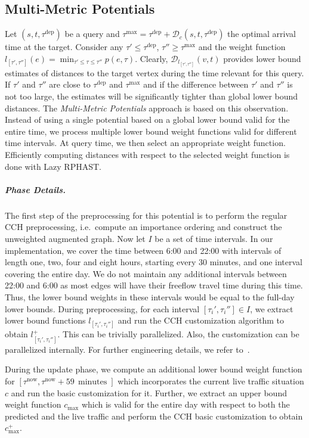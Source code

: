 \documentclass[a4paper,UKenglish,cleveref, autoref, thm-restate,anonymous]{lipics-v2021}
\newcommand*{\pred}{p}
\newcommand*{\comb}{c}
\newcommand*{\dist}{\mathcal{D}}
\newcommand*{\tdep}{\tau^{\operatorname{dep}}}
\newcommand*{\tmax}{\tau^{\max}}
\begin{document}
\subsection{Multi-Metric Potentials}

Let $(s,t,\tdep)$ be a query and $\tmax = \tdep + \dist_c(s,t,\tdep)$ the optimal arrival time at the target.
Consider any $\tau' \leq \tdep$, $\tau'' \geq \tmax$ and the weight function $l_{[\tau', \tau'']}(e) = \min_{\tau' \leq \tau \leq \tau''}\pred(e, \tau)$. %
Clearly, $\dist_{l_{[\tau', \tau'']}}(v,t)$ provides lower bound estimates of distances to the target vertex during the time relevant for this query.
If $\tau'$ and $\tau''$ are close to $\tdep$ and $\tmax$ and if the difference between $\tau'$ and $\tau''$ is not too large, the estimates will be significantly tighter than global lower bound distances.
The \emph{Multi-Metric Potentials} approach is based on this observation.
Instead of using a single potential based on a global lower bound valid for the entire time, we process multiple lower bound weight functions valid for different time intervals.
At query time, we then select an appropriate weight function.
Efficiently computing distances with respect to the selected weight function is done with Lazy RPHAST.

\subparagraph{Phase Details.}
The first step of the preprocessing for this potential is to perform the regular CCH preprocessing, i.e.\ compute an importance ordering and construct the unweighted augmented graph.
Now let $I$ be a set of time intervals.
In our implementation,
we cover the time between 6:00 and 22:00 with intervals of length one, two, four and eight hours, starting every 30 minutes,
and one interval covering the entire day.
We do not maintain any additional intervals between 22:00 and 6:00 as most edges will have their freeflow travel time during this time.
Thus, the lower bound weights in these intervals would be equal to the full-day lower bounds.
During preprocessing, for each interval $[\tau_i', \tau_i''] \in I$, we extract lower bound functions $l_{[\tau_i', \tau_i'']}$ and run the CCH customization algorithm to obtain $l_{[\tau_i', \tau_i'']}^+$.
This can be trivially parallelized.
Also, the customization can be parallelized internally.
For further engineering details, we refer to~\cite{dsw-cch-15,bsw-rttau-19,ghuw-fbndocch-19}.

During the update phase, we compute an additional lower bound weight function for $[\tau^{\operatorname{now}}, \tau^{\operatorname{now}} + 59\,\operatorname{minutes}]$ which incorporates the current live traffic situation $\comb$ and run the basic customization for it.
Further, we extract an upper bound weight function $\comb_{\max}$ which is valid for the entire day with respect to both the predicted and the live traffic and perform the CCH basic customization to obtain $\comb^+_{\max}$.
\end{document}
